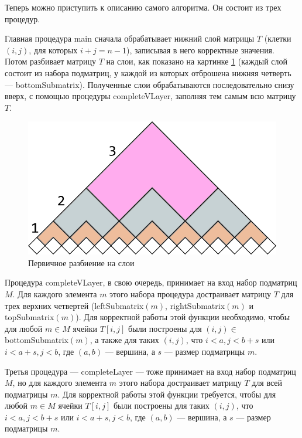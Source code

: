 \documentclass[12pt]{article}  %
\theoremstyle{definition}
\theoremstyle{remark}
\begin{document}
Теперь можно приступить к описанию самого алгоритма. Он состоит из трех процедур.

Главная процедура main сначала обрабатывает нижний слой матрицы $T$ (клетки $(i,j)$, для которых $i+j=n-1$), записывая в него корректные значения. Потом разбивает матрицу $T$ на слои, как показано на картинке \ref{gr:layers} (каждый слой состоит из набора подматриц, у каждой из которых отброшена нижняя четверть --- bottomSubmatrix). Полученные слои обрабатываются последовательно снизу вверх, с помощью процедуры completeVLayer, заполняя тем самым всю матрицу $T$. 

\begin{figure}[!ht]
  \caption{Первичное разбиение на слои}
  \label{gr:layers}
  \centering
    \includegraphics[width=0.9\linewidth]{layers.png}
\end{figure}

Процедура completeVLayer, в свою очередь, принимает на вход набор подматриц $M$. Для каждого элемента $m$ этого набора процедура достраивает матрицу $T$ для трех верхних четвертей (leftSubmatrix$(m)$, \linebreak rightSubmatrix$(m)$ и topSubmatrix$(m)$). Для корректной работы этой функции необходимо, чтобы для любой $m \in M$ ячейки $T[i,j]$ были построены  для $(i,j) \in\ $bottomSubmatrix$(m)$, а также для таких $(i,j)$, что $i < a, j < b+s$ или $i < a+s, j < b$, где $(a,b)$ --- вершина, а $s$ --- размер подматрицы $m$. 

Третья процедура --- completeLayer --- тоже принимает на вход набор подматриц $M$, но для каждого элемента $m$ этого набора достраивает матрицу $T$ для всей подматрицы $m$. Для корректной работы этой функции требуется, чтобы для любой $m \in M$ ячейки $T[i,j]$ были построены для таких $(i,j)$, что $i < a, j < b+s$ или $i < a+s, j < b$, где $(a,b)$ --- вершина, а $s$ --- размер подматрицы $m$. 
\end{document}
